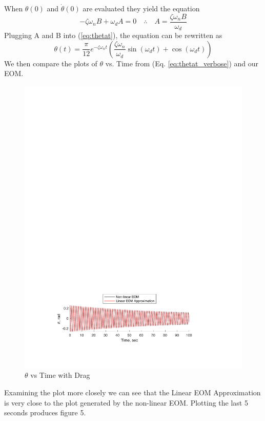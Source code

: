 \documentclass[12pt]{report}
\begin{document}
\begin{flushleft}
\begin{equation}
\end{equation}
When $\theta(0)$ and $\dot{\theta}(0)$ are evaluated they yield the equation
$$-\zeta\omega_nB+\omega_dA=0 \quad\therefore\quad A=\frac{\zeta\omega_nB}{\omega_d}$$
Plugging A and B into (\ref{eq:thetat}), the equation can be rewritten as
\begin{equation} \label{eq:thetat_verbose}
\theta(t)=\frac{\pi}{12}e^{-\zeta\omega_nt}\left(\frac{\zeta\omega_n}{\omega_d}\sin(\omega_dt)+\cos(\omega_dt)\right)
\end{equation}
\newpage
We then compare the plots of $\theta$ vs. Time from (Eq. \ref{eq:thetat_verbose}) and our EOM.\\
\begin{figure}[ht]
  \includegraphics[center]{compare}
  \caption{$\theta$ vs Time with Drag}
\end{figure}
Examining the plot more closely we can see that the Linear EOM Approximation is very close to the plot generated by the non-linear EOM. Plotting the last 5 seconds
produces figure 5.

\end{flushleft}
\end{document}
